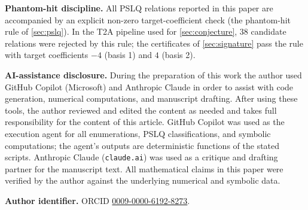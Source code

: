 \documentclass[11pt]{amsart}
\theoremstyle{definition}
\theoremstyle{remark}
\begin{document}
\textbf{Phantom-hit discipline.}  All PSLQ relations reported in
this paper are accompanied by an explicit non-zero target-coefficient
check (the phantom-hit rule of \textsection\ref{sec:pslq}).  In the
T2A pipeline used for \textsection\ref{sec:conjecture}, $38$
candidate relations were rejected by this rule; the certificates
of \textsection\ref{sec:signature} pass the rule with target
coefficients $-4$ (basis 1) and $4$ (basis 2).

\textbf{AI-assistance disclosure.}  During the preparation of this
work the author used GitHub Copilot (Microsoft) and Anthropic Claude
in order to assist with code generation, numerical computations, and
manuscript drafting.  After using these tools, the author reviewed
and edited the content as needed and takes full responsibility for
the content of this article.  GitHub Copilot was used as the
execution agent for all enumerations, PSLQ classifications, and
symbolic computations; the agent's outputs are deterministic
functions of the stated scripts.  Anthropic Claude
(\texttt{claude.ai}) was used as a critique and drafting partner
for the manuscript text.  All mathematical claims in this paper
were verified by the author against the underlying numerical and
symbolic data.

\textbf{Author identifier.}  ORCID
\href{https://orcid.org/0009-0000-6192-8273}%
{0009-0000-6192-8273}.
\end{document}
